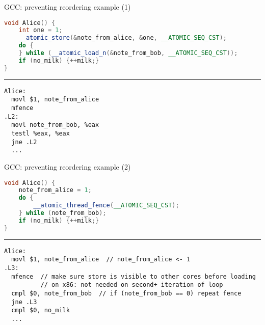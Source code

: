 \begin{frame}[fragile,label=prevReorder2]{GCC: preventing reordering example (1)}
\begin{lstlisting}[language=C++,style=smaller]
void Alice() {
    int one = 1;
    __atomic_store(&note_from_alice, &one, __ATOMIC_SEQ_CST);
    do {
    } while (__atomic_load_n(&note_from_bob, __ATOMIC_SEQ_CST));
    if (no_milk) {++milk;}
}
\end{lstlisting}
\hrule
\begin{lstlisting}[language=myasm,style=small,morekeywords=mfence]
Alice:
  movl $1, note_from_alice
  mfence
.L2:
  movl note_from_bob, %eax
  testl %eax, %eax
  jne .L2
  ...
\end{lstlisting}
\end{frame}

\begin{frame}[fragile,label=prevReorder1]{GCC: preventing reordering example (2)}
\begin{lstlisting}[language=C++,style=small]
void Alice() {
    note_from_alice = 1;
    do {
        __atomic_thread_fence(__ATOMIC_SEQ_CST);
    } while (note_from_bob);
    if (no_milk) {++milk;}
}
\end{lstlisting}
\hrule
\begin{lstlisting}[language=myasm,style=small,morekeywords=mfence]
Alice:
  movl $1, note_from_alice  // note_from_alice <- 1
.L3:
  mfence  // make sure store is visible to other cores before loading
          // on x86: not needed on second+ iteration of loop
  cmpl $0, note_from_bob  // if (note_from_bob == 0) repeat fence
  jne .L3
  cmpl $0, no_milk
  ...
\end{lstlisting}
\end{frame}


